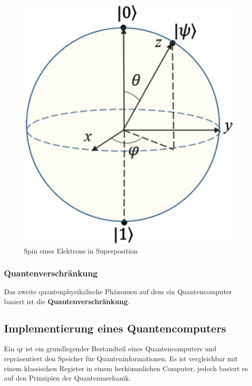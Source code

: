 \begin{figure}[!hbt]
    \centering
    \includegraphics{./images/spin-superpostition.jpg}
    \caption{Spin eines Elektrons in Superposition \cite{noauthor_cpb_27_9_090308_f8jpg_nodate}}
    \label{fig:spin}
\end{figure}

\subsubsection{Quantenverschränkung}
Das zweite quantenphysikalische Phänomen auf dem ein Quantencomputer basiert ist die \textbf{Quantenverschränkung}. 

\subsection{Implementierung eines Quantencomputers}



Ein \ac{qr} ist ein grundlegender Bestandteil eines Quantencomputers und repräsentiert den Speicher für Quanteninformationen. Es ist vergleichbar mit einem klassischen Register in einem herkömmlichen Computer, jedoch basiert es auf den Prinzipien der Quantenmechanik.

